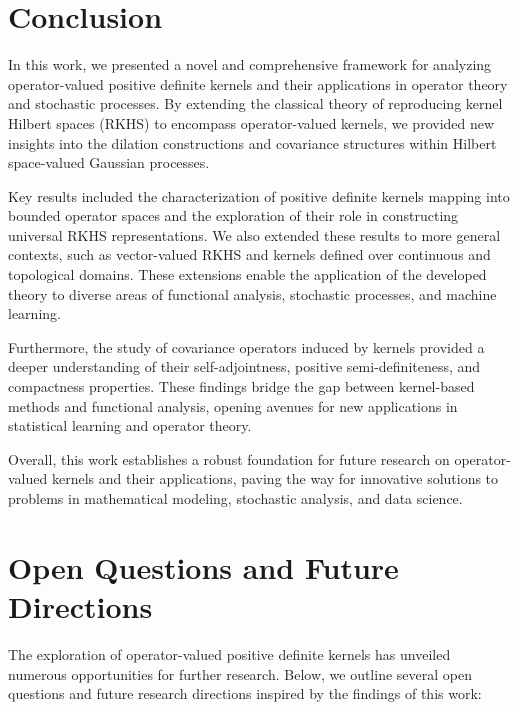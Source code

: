 \documentclass[11pt]{amsart}
\theoremstyle{definition}
\numberwithin{equation}{section}
\begin{document}
\section{Conclusion}
In this work, we presented a novel and comprehensive framework for analyzing operator-valued positive definite kernels and their applications in operator theory and stochastic processes. By extending the classical theory of reproducing kernel Hilbert spaces (RKHS) to encompass operator-valued kernels, we provided new insights into the dilation constructions and covariance structures within Hilbert space-valued Gaussian processes. 

Key results included the characterization of positive definite kernels mapping into bounded operator spaces and the exploration of their role in constructing universal RKHS representations. We also extended these results to more general contexts, such as vector-valued RKHS and kernels defined over continuous and topological domains. These extensions enable the application of the developed theory to diverse areas of functional analysis, stochastic processes, and machine learning.

Furthermore, the study of covariance operators induced by kernels provided a deeper understanding of their self-adjointness, positive semi-definiteness, and compactness properties. These findings bridge the gap between kernel-based methods and functional analysis, opening avenues for new applications in statistical learning and operator theory.

Overall, this work establishes a robust foundation for future research on operator-valued kernels and their applications, paving the way for innovative solutions to problems in mathematical modeling, stochastic analysis, and data science.

\section{Open Questions and Future Directions}

The exploration of operator-valued positive definite kernels has unveiled numerous opportunities for further research. Below, we outline several open questions and future research directions inspired by the findings of this work:
\end{document}
